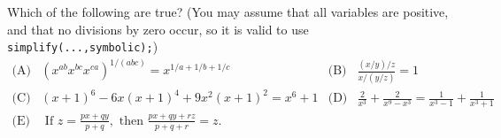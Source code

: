 \documentclass[a4paper,10pt]{amsbook}
\begin{document}
\begin{exercise}\label{ex-truefalse}
 Which of the following are true?  (You may assume that all variables
 are positive, and that no divisions by zero occur, so it is valid to
 use \verb+simplify(...,symbolic);+)
 \[ \begin{array}{rlrl}
  \text{(A)} &
   (x^{ab}x^{bc}x^{ca})^{1/(abc)}=x^{1/a + 1/b + 1/c} &
  \text{(B)} &
   \frac{(x/y)/z}{x/(y/z)}=1 \\
  \text{(C)} & 
   (x+1)^6-6x(x+1)^4+9x^2(x+1)^2=x^6+1 &
  \text{(D)} &
   \frac{2}{x^3}+\frac{2}{x^9-x^3}=\frac{1}{x^3-1}+\frac{1}{x^3+1} \\
  \text{(E)} &
   \text{ If } z=\frac{px+qy}{p+q}, \text{ then }
      \frac{px+qy+rz}{p+q+r}=z. & & 
 \end{array} \]
\end{exercise}
\end{document}
